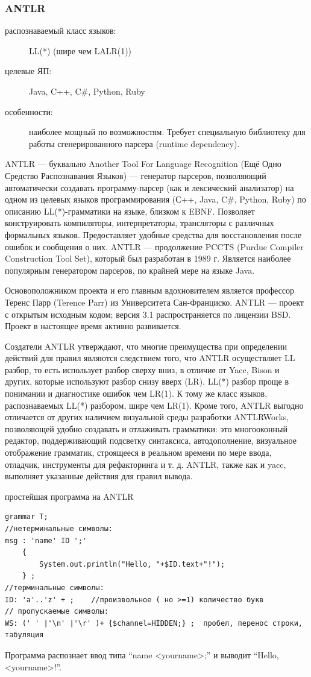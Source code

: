 \documentclass[a4paper,12pt,titlepage]{extarticle}
\begin{document}
\subsubsection*{ANTLR}
\begin{description}
  \item[распознаваемый класс языков:] LL(*) (шире чем LALR(1))
  \item[целевые ЯП:] Java, C++, C\#, Python, Ruby
  \item[особенности:] наиболее мощный по возможностям. Требует специальную
  библиотеку для работы сгенерированного парсера (runtime dependency).
\end{description}
ANTLR — буквально Another Tool For Language Recognition (Ещё Одно Средство
Распознавания Языков) — генератор парсеров, позволяющий автоматически создавать
программу-парсер (как и лексический анализатор) на одном из целевых языков
программирования (С++, Java, C\#, Python, Ruby) по описанию LL(*)-грамматики на
языке, близком к EBNF. Позволяет конструировать компиляторы, интерпретаторы,
трансляторы с различных формальных языков. Предоставляет удобные средства для
восстановления после ошибок и сообщения о них. ANTLR — продолжение PCCTS (Purdue
Compiler Construction Tool Set), который был разработан в 1989 г. Является
наиболее популярным генератором парсеров, по крайней мере на языке Java.

Основоположником проекта и его главным вдохновителем является профессор Теренс
Парр (Terence Parr) из Университета Сан-Франциско. ANTLR — проект с открытым
исходным кодом; версия 3.1 распространяется по лицензии BSD. Проект в
настоящее время активно развивается.

Создатели ANTLR утверждают, что многие преимущества при определении действий
для правил являются следствием того, что ANTLR осуществляет LL разбор, то есть
использует разбор сверху вниз, в отличие от Yacc, Bison и других, которые
используют разбор снизу вверх (LR). LL(*) разбор проще в понимании и
диагностике ошибок чем LR(1). К тому же класс языков, распознаваемых LL(*)
разбором, шире чем LR(1). Кроме того, ANTLR выгодно отличается от других
наличием визуальной среды разработки ANTLRWorks, позволяющей удобно создавать и
отлаживать грамматики: это многооконный редактор, поддерживающий подсветку
синтаксиса, автодополнение, визуальное отображение грамматик, строящееся в
реальном времени по мере ввода, отладчик, инструменты для рефакторинга и т. д.
ANTLR, также как и yacc, выполняет указанные действия для правил вывода.

простейшая программа на ANTLR
\begin{verbatim}
grammar T;
//нетерминальные символы:
msg : 'name' ID ';' 
	{
		System.out.println("Hello, "+$ID.text+"!");
	} ;
//терминальные символы:
ID: 'a'..'z' + ;	//произвольное ( но >=1) количество букв
// пропускаемые символы:
WS: (' ' |'\n' |'\r' )+ {$channel=HIDDEN;} ;  пробел, перенос строки, табуляция
\end{verbatim}
Программа распознает ввод типа ``name <yourname>;'' и выводит ``Hello,
<yourname>!''.
\end{document}

